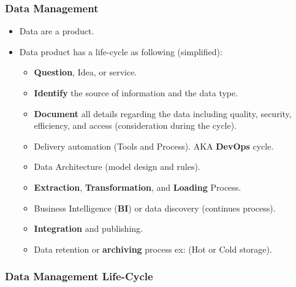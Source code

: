 \begin{frame}
\frametitle{Data Management}

\begin{itemize}[<+->]
\item Data are a product.
\item Data product has a life-cycle as following (simplified):
\begin{itemize}[<+->]
	\item \textbf{Question}, Idea, or service.
	\item \textbf{Identify} the source of information and the data type.
	\item \textbf{Document} all details regarding the data including quality, security, efficiency, and access (consideration during the cycle).
	\item Delivery automation (Tools and Process). AKA \textbf{DevOps} cycle.
	\item Data Architecture (model design and rules).
	\item \textbf{Extraction}, \textbf{Transformation}, and \textbf{Loading} Process.
	\item Business Intelligence (\textbf{BI}) or data discovery (continues process).
	\item \textbf{Integration} and publishing.
	\item Data retention or \textbf{archiving} process ex: (Hot or Cold storage).
\end{itemize}
\end{itemize}

\end{frame}


\begin{frame}
\frametitle{Data Management Life-Cycle}
\end{frame}

\VideoClassification[column=2, colour=blue]
